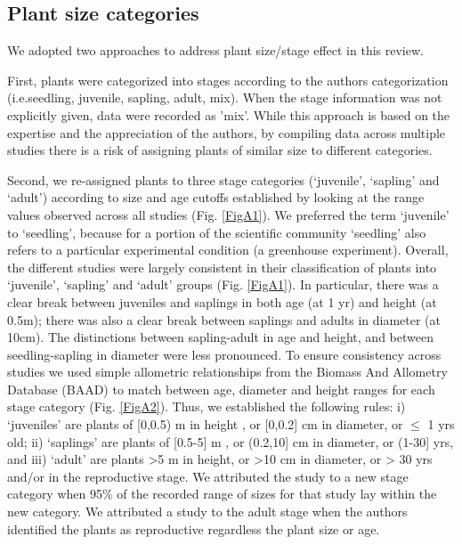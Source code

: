 \documentclass[a4paper]{article}\usepackage[]{graphicx}\usepackage[]{color}
\begin{document}
\subsection*{Plant size categories}\label{plant-size-categories}

We adopted two approaches to address plant size/stage effect in this review.

First, plants were categorized into stages according to the authors categorization (i.e.seedling, juvenile, sapling, adult, mix). When the stage information was not explicitly given, data were recorded as 'mix'. While this approach is based on the expertise and the appreciation of the authors, by compiling data across multiple studies there is a risk of assigning plants of similar size to different categories.

Second, we re-assigned plants to three stage categories (`juvenile', `sapling' and `adult') according to size and age cutoffs established by looking at the range values observed across all studies (Fig. \ref{FigA1}). We preferred the term `juvenile' to `seedling', because for a portion of the scientific community `seedling' also refers to a particular experimental condition (a greenhouse experiment). Overall, the different studies were largely consistent in their classification of plants into `juvenile', `sapling' and `adult' groups  (Fig. \ref{FigA1}). In particular, there was a clear break between juveniles and saplings in both age (at 1 yr) and height (at 0.5m); there was also a clear break between saplings and adults in diameter (at 10cm). The distinctions between sapling-adult in age and height, and between seedling-sapling in diameter were less pronounced. To ensure consistency across studies we used simple allometric relationships from the Biomass And Allometry Database (BAAD) \citep{Falster:2015} to match between age, diameter and height ranges for each stage category (Fig. \ref{FigA2}). Thus, we established the following rules: i) `juveniles' are plants of {[}0,0.5) m in height , or {[}0,0.2{]} cm in diameter, or $\leq$ 1 yrs old; ii) `saplings' are plants of {[}0.5-5{]} m , or (0.2,10{]} cm in diameter, or (1-30{]} yrs, and iii) `adult' are plants \textgreater{}5 m in height, or \textgreater{}10 cm in diameter, or \textgreater{} 30 yrs and/or in the reproductive stage. We attributed the study to a new stage category when 95\% of the recorded range of sizes for that study lay within the new category. We attributed a study to the adult stage when the authors identified the plants as reproductive regardless the plant size or age.
\end{document}
